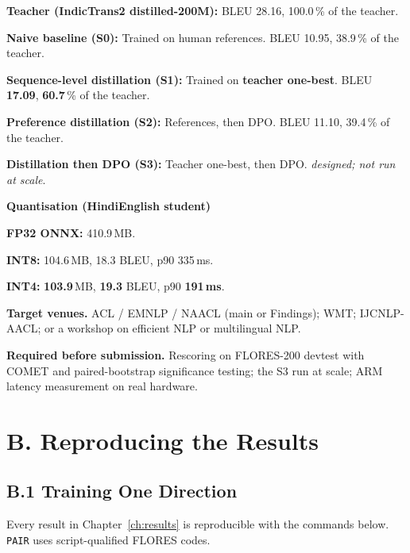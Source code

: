 \begin{bullets}
\item \textbf{Teacher (IndicTrans2 distilled-200M):} BLEU 28.16, 100.0\,\% of the teacher.
\item \textbf{Naive baseline (S0):} Trained on human references. BLEU 10.95, 38.9\,\% of the teacher.
\item \textbf{Sequence-level distillation (S1):} Trained on \textbf{teacher one-best}. BLEU \textbf{17.09}, \textbf{60.7}\,\% of the teacher.
\item \textbf{Preference distillation (S2):} References, then DPO. BLEU 11.10, 39.4\,\% of the teacher.
\item \textbf{Distillation then DPO (S3):} Teacher one-best, then DPO. \textit{designed; not run at scale}.
\end{bullets}

\noindent\textbf{Quantisation (Hindi\arrowto{}English student)}
\vspace{3pt}

\begin{bullets}
\item \textbf{FP32 ONNX:} 410.9\,MB.
\item \textbf{INT8:} 104.6\,MB, 18.3 BLEU, p90 335\,ms.
\item \textbf{INT4:} \textbf{103.9}\,MB, \textbf{19.3} BLEU, p90 \textbf{191\,ms}.
\end{bullets}

\noindent\textbf{Target venues.} ACL / EMNLP / NAACL (main or Findings);
WMT; IJCNLP-AACL; or a workshop on efficient NLP or multilingual NLP.

\vspace{4pt}
\noindent\textbf{Required before submission.} Rescoring on FLORES-200 devtest
with COMET and paired-bootstrap significance testing; the S3 run at scale; ARM
latency measurement on real hardware.

\clearpage

\section*{B. Reproducing the Results}

\subsection*{B.1 Training One Direction}

Every result in Chapter~\ref{ch:results} is reproducible with the commands
below. \texttt{PAIR} uses script-qualified FLORES codes.

